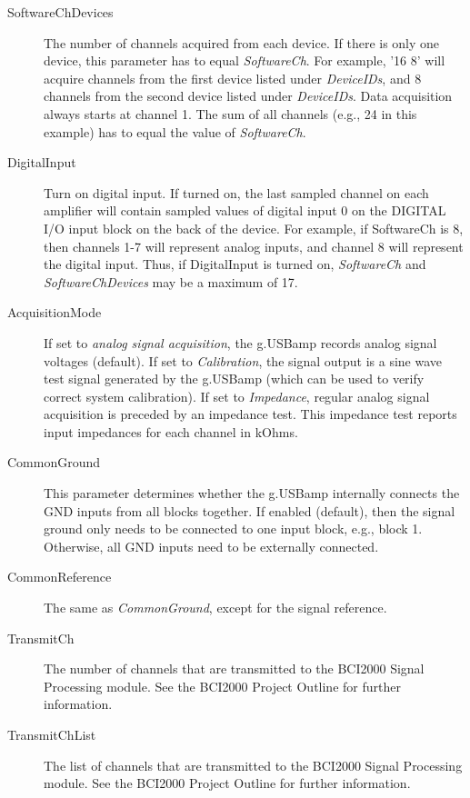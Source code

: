 \documentclass[letterpaper, oneside, 12pt]{article}
\begin{document}
\begin{description}
 \item [SoftwareChDevices] The number of channels acquired from each device. 
                           If there is only one device, this parameter has to equal \textit{SoftwareCh}.
                           For example, '16 8' will acquire channels from the 
                           first device listed under \textit{DeviceIDs}, and 8 channels
                           from the second device listed under \textit{DeviceIDs}.
                           Data acquisition always starts at channel 1.
                           The sum of all channels (e.g., 24 in this example) has to 
                           equal the value of \textit{SoftwareCh}.
 \item [DigitalInput]      Turn on digital input. If turned on, the last sampled channel
                           on each amplifier will contain sampled values of  
                           digital input 0 on the DIGITAL I/O input block on the 
                           back of the device. For example, if SoftwareCh is 8, then
                           channels 1-7 will represent analog inputs, and channel 8 will
                           represent the digital input. Thus, if DigitalInput is turned on,
                           \textit{SoftwareCh} and \textit{SoftwareChDevices}
                           may be a maximum of 17.
 \item [AcquisitionMode]   If set to \emph{analog signal acquisition}, the g.USBamp records
                           analog signal voltages (default). If set to \emph{Calibration},
                           the signal output is a sine wave test signal generated by the g.USBamp
                           (which can be used to verify correct system calibration). 
                           If set to \emph{Impedance}, regular analog signal acquisition is
                           preceded by an impedance test. This impedance test reports 
                           input impedances for each channel in kOhms.
 \item [CommonGround]      This parameter determines whether the g.USBamp internally connects
                           the GND inputs from all blocks together. If enabled (default), then
                           the signal ground only needs to be connected to one input block, e.g.,
                           block 1. Otherwise, all GND inputs need to be externally connected.
 \item [CommonReference]   The same as \emph{CommonGround}, except for the signal reference.
 \item [TransmitCh]        The number of channels that are transmitted to the BCI2000 
                           Signal Processing module. See the BCI2000 Project
                           Outline for further information.
 \item [TransmitChList]    The list of channels that are transmitted to the BCI2000 
                           Signal Processing module. See the BCI2000 Project
                           Outline for further information.                                                                        
\end{description}
\end{document}
